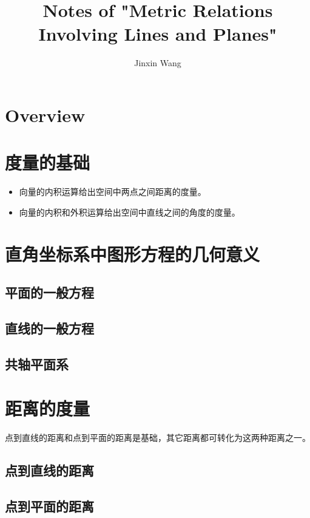 \documentclass[onecolumn]{ctexart}
\title{Notes of "Metric Relations Involving Lines and Planes"}
\author{Jinxin Wang}
\date{}
\begin{document}
\maketitle

\section{Overview}

\section{度量的基础}
\begin{itemize}
  \item 向量的内积运算给出空间中两点之间距离的度量。
  \item 向量的内积和外积运算给出空间中直线之间的角度的度量。
\end{itemize}

\section{直角坐标系中图形方程的几何意义}

\subsection{平面的一般方程}

\subsection{直线的一般方程}

\subsection{共轴平面系}

\section{距离的度量}
点到直线的距离和点到平面的距离是基础，其它距离都可转化为这两种距离之一。

\subsection{点到直线的距离}

\subsection{点到平面的距离}
\end{document}
